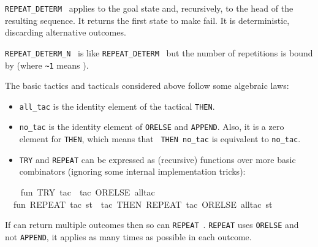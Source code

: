 \begin{isabellebody}
\begin{isamarkuptext}
\begin{description}
  \item \verb|REPEAT_DETERM|~ applies  to the
  goal state and, recursively, to the head of the resulting sequence.
  It returns the first state to make  fail.  It is
  deterministic, discarding alternative outcomes.

  \item \verb|REPEAT_DETERM_N|~ is like \verb|REPEAT_DETERM|~ but the number of repetitions is bound
  by  (where \verb|~1| means ).

  \end{description}%
\end{isamarkuptext}%
\isamarkuptrue%
%
\endisatagmlref
{\isafoldmlref}%
%
\isadelimmlref
%
\endisadelimmlref
%
\isadelimmlex
%
\endisadelimmlex
%
\isatagmlex
%
\begin{isamarkuptext}%
The basic tactics and tacticals considered above follow
  some algebraic laws:

  \begin{itemize}

  \item \verb|all_tac| is the identity element of the tactical \verb|THEN|.

  \item \verb|no_tac| is the identity element of \verb|ORELSE| and
  \verb|APPEND|.  Also, it is a zero element for \verb|THEN|,
  which means that ~\verb|THEN|~\verb|no_tac| is
  equivalent to \verb|no_tac|.

  \item \verb|TRY| and \verb|REPEAT| can be expressed as (recursive)
  functions over more basic combinators (ignoring some internal
  implementation tricks):

  \end{itemize}%
\end{isamarkuptext}%
\isamarkuptrue%
%
\endisatagmlex
{\isafoldmlex}%
%
\isadelimmlex
%
\endisadelimmlex
%
\isadelimML
%
\endisadelimML
%
\isatagML
{}\isamarkupfalse%
\ {}\isanewline
\ \ fun\ TRY\ tac\ {}\ tac\ ORELSE\ all{}tac{}\isanewline
\ \ fun\ REPEAT\ tac\ st\ {}\ {}{}tac\ THEN\ REPEAT\ tac{}\ ORELSE\ all{}tac{}\ st{}\isanewline
{}%
\endisatagML
{\isafoldML}%
%
\isadelimML
%
\endisadelimML
%
\begin{isamarkuptext}%
If  can return multiple outcomes then so can \verb|REPEAT|~.  \verb|REPEAT| uses \verb|ORELSE| and not
  \verb|APPEND|, it applies  as many times as
  possible in each outcome.


\end{isamarkuptext}
\end{isabellebody}
